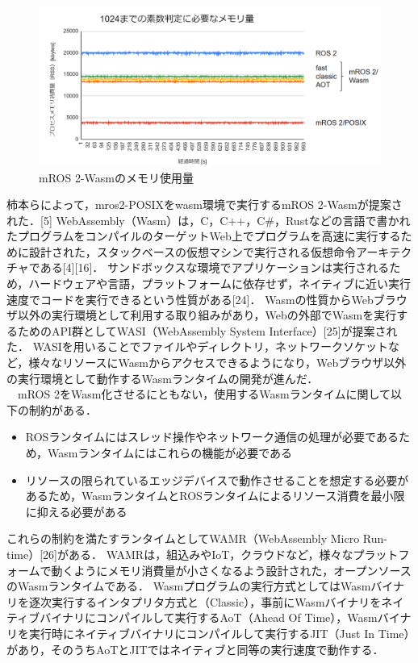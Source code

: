 \begin{figure}[ht]
    \centering
    \includegraphics[width=13cm]{images/fig3_mros2-wasm_memory.png}
    \caption{mROS 2-Wasmのメモリ使用量}
    \label{fig:mros2-wasm_configuration}
\end{figure}
柿本らによって，mros2-POSIXをwasm環境で実行するmROS 2-Wasmが提案された．[5]
WebAssembly（Wasm）は，C，C++，C\#，Rustなどの言語で書かれたプログラムをコンパイルのターゲットWeb上でプログラムを高速に実行するために設計された，スタックベースの仮想マシンで実行される仮想命令アーキテクチャである[4][16]．
サンドボックスな環境でアプリケーションは実行されるため，ハードウェアや言語，プラットフォームに依存せず，ネイティブに近い実行速度でコードを実行できるという性質がある[24]．
Wasmの性質からWebブラウザ以外の実行環境として利用する取り組みがあり，Webの外部でWasmを実行するためのAPI群としてWASI（WebAssembly System Interface）[25]が提案された．
WASIを用いることでファイルやディレクトリ，ネットワークソケットなど，様々なリソースにWasmからアクセスできるようになり，Webブラウザ以外の実行環境として動作するWasmランタイムの開発が進んだ．
\\　mROS 2をWasm化させるにともない，使用するWasmランタイムに関して以下の制約がある．
\begin{itemize}
    \item ROSランタイムにはスレッド操作やネットワーク通信の処理が必要であるため，Wasmランタイムにはこれらの機能が必要である
    \item リソースの限られているエッジデバイスで動作させることを想定する必要があるため，WasmランタイムとROSランタイムによるリソース消費を最小限に抑える必要がある
\end{itemize}
これらの制約を満たすランタイムとしてWAMR（WebAssembly Micro Run-time）[26]がある．
WAMRは，組込みやIoT，クラウドなど，様々なプラットフォームで動くようにメモリ消費量が小さくなるよう設計された，オープンソースのWasmランタイムである．
Wasmプログラムの実行方式としてはWasmバイナリを逐次実行するインタプリタ方式と（Classic），事前にWasmバイナリをネイティブバイナリにコンパイルして実行するAoT（Ahead Of Time），Wasmバイナリを実行時にネイティブバイナリにコンパイルして実行するJIT（Just In Time）があり，そのうちAoTとJITではネイティブと同等の実行速度で動作する．
